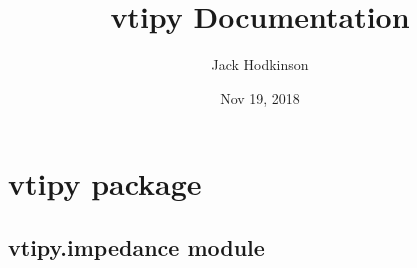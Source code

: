 \documentclass[letterpaper,10pt,english]{sphinxmanual}
\title{vtipy Documentation}
\date{Nov 19, 2018}
\author{Jack Hodkinson}
\begin{document}
\maketitle
\sphinxtableofcontents
{}\label{\detokenize{index::doc}}



\chapter{vtipy package}
\label{\detokenize{vtipy_docs/vtipy:vtipy-package}}\label{\detokenize{vtipy_docs/vtipy::doc}}\label{\detokenize{vtipy_docs/vtipy:welcome-to-vtipy-s-documentation}}

\section{vtipy.impedance module}
\label{\detokenize{vtipy_docs/vtipy:vtipy-impedance-module}}\label{\detokenize{vtipy_docs/vtipy:module-vtipy.impedance}}
\end{document}
